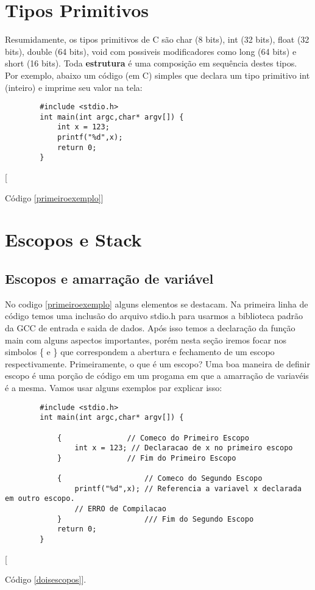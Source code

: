 \documentclass{amsbook}
\begin{document}
	\section{Tipos Primitivos}
		Resumidamente, os tipos primitivos de C são char (8 bits), int (32 bits), float (32 bits), double (64 bits), void com possiveis modificadores como long (64 bits) e short (16 bits). Toda \textbf{estrutura} é uma composição em sequência destes tipos.
		Por exemplo, abaixo um código (em C) simples que declara um tipo primitivo int (inteiro) e imprime seu valor na tela:
		\begin{lstlisting}
		#include <stdio.h>
		int main(int argc,char* argv[]) {
			int x = 123;
			printf("%d",x);
			return 0;
		}
		\end{lstlisting}[{\label{primeiroexemplo}Código \ref{primeiroexemplo}] 

	\section{Escopos e Stack}
		\subsection{Escopos e amarração de variável}

		No codigo \ref{primeiroexemplo} alguns elementos se destacam. Na primeira linha de código temos uma inclusão do arquivo stdio.h para usarmos a biblioteca padrão da GCC de entrada e saida de dados. Após isso temos a declaração da função main com alguns aspectos importantes, porém nesta seção iremos focar nos simbolos \{ e \} que correspondem a abertura e fechamento de um escopo respectivamente.
		Primeiramente, o que é um escopo? Uma boa maneira de definir escopo é uma porção de código em um progama em que a amarração de variavéis é a mesma. Vamos usar alguns exemplos par explicar isso:

		\begin{lstlisting}
		#include <stdio.h>
		int main(int argc,char* argv[]) {

			{				// Comeco do Primeiro Escopo
				int x = 123; // Declaracao de x no primeiro escopo
			}				// Fim do Primeiro Escopo

			{					// Comeco do Segundo Escopo
				printf("%d",x); // Referencia a variavel x declarada em outro escopo.
				// ERRO de Compilacao
			} 					/// Fim do Segundo Escopo
			return 0;
		}
		\end{lstlisting}[{\label{doisescopos}Código \ref{doisescopos}].

}}
\end{document}
